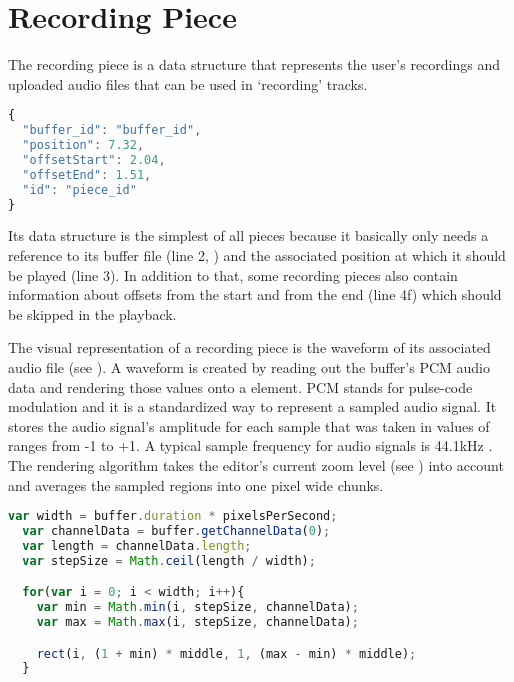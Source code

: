 \section{Recording Piece}
\label{impl-recording-piece}

The recording piece is a data structure that represents the user's recordings and uploaded audio files that can be used in `recording' tracks.

\begin{lstlisting}[language=JavaScript, caption=The recording piece's data structure, label=lst:recording-piece]
{
  "buffer_id": "buffer_id",
  "position": 7.32,
  "offsetStart": 2.04,
  "offsetEnd": 1.51,
  "id": "piece_id"
}
\end{lstlisting}

Its data structure is the simplest of all pieces because it basically only needs a reference to its buffer file (line 2, ) and the associated position at which it should be played (line 3). In addition to that, some recording pieces also contain information about offsets from the start and from the end (line 4f) which should be skipped in the playback.

The visual representation of a recording piece is the waveform of its associated audio file (see ). A waveform is created by reading out the buffer's PCM audio data and rendering those values onto a  element. PCM stands for pulse-code modulation and it is a standardized way to represent a sampled audio signal. It stores the audio signal's amplitude for each sample that was taken in values of ranges from -1 to +1. A typical sample frequency for audio signals is 44.1kHz \cite[p. 26]{park2009introductionto}. The rendering algorithm takes the editor's current zoom level (see ) into account and averages the sampled regions into one pixel wide chunks.

\begin{lstlisting}[language=JavaScript, caption=Simplified waveform algorithm, label=lst:waveform]
  var width = buffer.duration * pixelsPerSecond;
  var channelData = buffer.getChannelData(0);
  var length = channelData.length;
  var stepSize = Math.ceil(length / width);

  for(var i = 0; i < width; i++){
    var min = Math.min(i, stepSize, channelData);
    var max = Math.max(i, stepSize, channelData);

    rect(i, (1 + min) * middle, 1, (max - min) * middle);
  }
\end{lstlisting}

